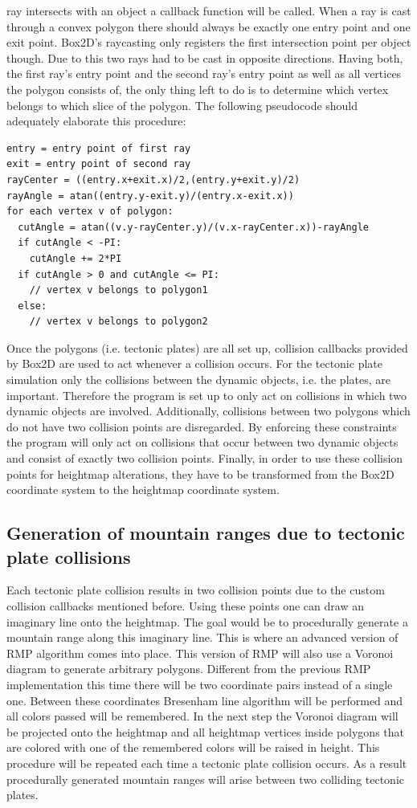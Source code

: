 \documentclass[11pt,a4paper,twoside,openright]{report}
\begin{document}
ray intersects with an object a callback function will be called. When a ray is cast through a convex polygon there should always be exactly one entry point and one exit point. Box2D's raycasting only registers the first intersection point per object though. Due to this two rays had to be cast in opposite directions. Having both, the first ray's entry point and the second ray's entry point as well as all vertices the polygon consists of, the only thing left to do is to determine which vertex belongs to which slice of the polygon. The following pseudocode should adequately elaborate this procedure:
\begin{lstlisting}[caption=Point in slice check pseudocode]
entry = entry point of first ray
exit = entry point of second ray
rayCenter = ((entry.x+exit.x)/2,(entry.y+exit.y)/2)
rayAngle = atan((entry.y-exit.y)/(entry.x-exit.x))
for each vertex v of polygon:
  cutAngle = atan((v.y-rayCenter.y)/(v.x-rayCenter.x))-rayAngle
  if cutAngle < -PI:
    cutAngle += 2*PI
  if cutAngle > 0 and cutAngle <= PI:
    // vertex v belongs to polygon1
  else:
    // vertex v belongs to polygon2
\end{lstlisting}
Once the polygons (i.e. tectonic plates) are all set up, collision callbacks provided by Box2D are used to act whenever a collision occurs. For the tectonic plate simulation only the collisions between the dynamic objects, i.e. the plates, are important. Therefore the program is set up to only act on collisions in which two dynamic objects are involved. Additionally, collisions between two polygons which do not have two collision points are disregarded. By enforcing these constraints the program will only act on collisions that occur between two dynamic objects and consist of exactly two collision points. Finally, in order to use these collision points for heightmap alterations, they have to be transformed from the Box2D coordinate system to the heightmap coordinate system.

\subsection{Generation of mountain ranges due to tectonic plate collisions}
Each tectonic plate collision results in two collision points due to the custom collision callbacks mentioned before. Using these points one can draw an imaginary line onto the heightmap. The goal would be to procedurally generate a mountain range along this imaginary line. This is where an advanced version of RMP algorithm comes into place. This version of RMP will also use a Voronoi diagram to generate arbitrary polygons. Different from the previous RMP implementation this time there will be two coordinate pairs instead of a single one. Between these coordinates Bresenham line algorithm will be performed and all colors passed will be remembered. In the next step the Voronoi diagram will be projected onto the heightmap and all heightmap vertices inside polygons that are colored with one of the remembered colors will be raised in height. This procedure will be repeated each time a tectonic plate collision occurs. As a result procedurally generated mountain ranges will arise between two colliding tectonic plates.
\end{document}
